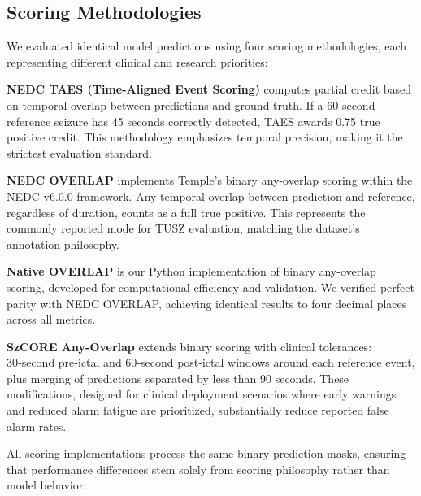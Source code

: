 \documentclass[
  10pt,
]{article}
\begin{document}
\hypertarget{scoring-methodologies}{%
\subsection{Scoring Methodologies}\label{scoring-methodologies}}

We evaluated identical model predictions using four scoring
methodologies, each representing different clinical and research
priorities:

\textbf{NEDC TAES (Time-Aligned Event Scoring)} computes partial credit
based on temporal overlap between predictions and ground truth. If a
60-second reference seizure has 45 seconds correctly detected, TAES
awards 0.75 true positive credit. This methodology emphasizes temporal
precision, making it the strictest evaluation standard.

\textbf{NEDC OVERLAP} implements Temple's binary any-overlap scoring
within the NEDC v6.0.0 framework. Any temporal overlap between
prediction and reference, regardless of duration, counts as a full true
positive. This represents the commonly reported mode for TUSZ
evaluation, matching the dataset's annotation philosophy.

\textbf{Native OVERLAP} is our Python implementation of binary
any-overlap scoring, developed for computational efficiency and
validation. We verified perfect parity with NEDC OVERLAP, achieving
identical results to four decimal places across all metrics.

\textbf{SzCORE Any-Overlap} extends binary scoring with clinical
tolerances: 30‑second pre‑ictal and 60‑second post‑ictal windows around
each reference event, plus merging of predictions separated by less than
90 seconds. These modifications, designed for clinical deployment
scenarios where early warnings and reduced alarm fatigue are
prioritized, substantially reduce reported false alarm rates.

All scoring implementations process the same binary prediction masks,
ensuring that performance differences stem solely from scoring
philosophy rather than model behavior.
\end{document}
